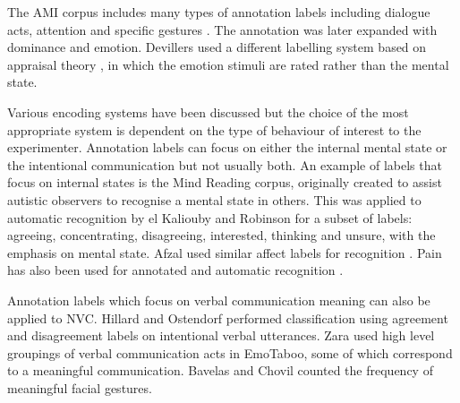 The AMI corpus includes many types of annotation labels including dialogue acts, attention and specific gestures \cite{Carletta2007}. The annotation was later expanded with dominance \cite{Aran2010} and emotion. Devillers \cite{Devillers2008} used a different labelling system based on appraisal theory \cite{Scherer1999}, in which the emotion stimuli are rated rather than the mental state.


Various encoding systems have been discussed but the choice of the most appropriate system is dependent on the type of behaviour of interest to the experimenter. Annotation labels can focus on either the internal mental state or the intentional communication but not usually both. An example of labels that focus on internal states is the Mind Reading corpus, originally created to assist autistic observers to recognise a mental state in others. This was applied to automatic recognition by el Kaliouby and Robinson \cite{ElKaliouby2004} for a subset of labels: agreeing, concentrating, disagreeing, interested, thinking and unsure, with the emphasis on mental state. Afzal \etal used similar affect labels for recognition \cite{Afzal2009b}. Pain has also been used for annotated and automatic recognition \cite{Ashraf2007, Lucey2009}. 

Annotation labels which focus on verbal communication meaning can also be applied to \ac{NVC}. Hillard and Ostendorf \cite{Hillard03} performed classification using agreement and disagreement labels on intentional verbal utterances. Zara \etal \cite{Zara2007} used high level groupings of verbal communication acts in EmoTaboo, some of which correspond to a meaningful communication. Bavelas and Chovil \cite{Bavelas97} counted the frequency of meaningful facial gestures. 

